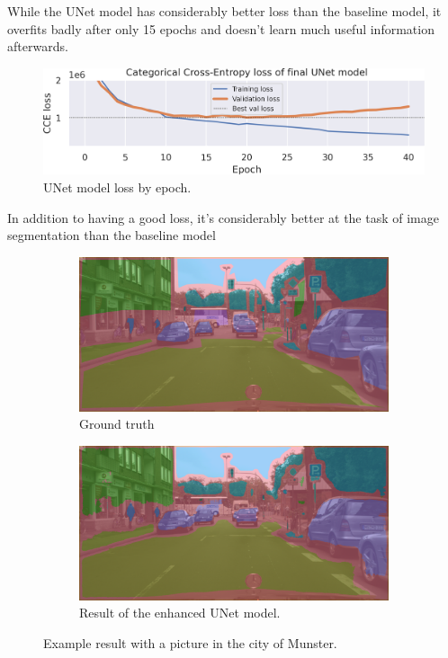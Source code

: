 While the UNet model has considerably better loss than the baseline model, it overfits badly after only 15 epochs and doesn't learn much useful information afterwards.

\begin{figure}[h]
	\centering
	\includegraphics[width=.9\textwidth]{unet_loss.png}
	\caption{UNet model loss by epoch.}
\end{figure}

In addition to having a good loss, it's considerably better at the task of image segmentation than the baseline model

\begin{figure}[h]
	\begin{subfigure}{.5\textwidth}
		\includegraphics[width=\textwidth]{city_images/unet_gt_pic.png}
		\caption{Ground truth}
	\end{subfigure}
	\begin{subfigure}{.5\textwidth}
		\includegraphics[width=\textwidth]{city_images/unet_pic.png}
		\caption{Result of the enhanced UNet model.}
	\end{subfigure}
	\caption{Example result with a picture in the city of Munster.}
\end{figure}

